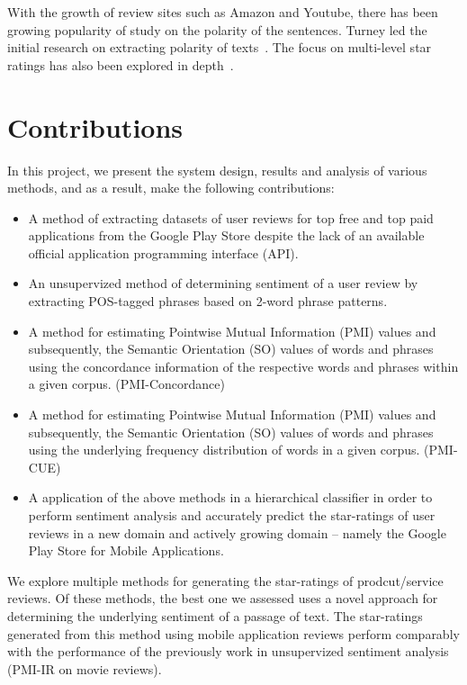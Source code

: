 \documentclass[11pt]{report} %
\begin{document}
With the growth of review sites such as Amazon and Youtube, there has been
growing popularity of study on the polarity of the sentences. Turney led the
initial research on extracting polarity of texts~\cite{Turney2001,
Pang:2002:TUS:1118693.1118704}. The focus on multi-level star ratings has also
been explored in depth~\cite{Pang+Lee:05a}.


\section{Contributions}
In this project, we present the system design, results and analysis of various methods, and as a result, make the following contributions:
\begin{itemize}
	\item A method of extracting datasets of user reviews for top free and top paid applications from the Google Play Store despite the lack of an available official application programming interface (API).
	\item An unsupervized method of determining sentiment of a user review by extracting POS-tagged phrases based on 2-word phrase patterns.
	\item A method for estimating Pointwise Mutual Information (PMI) values and subsequently, the Semantic Orientation (SO) values of words and phrases using the concordance information of the respective words and phrases within a given corpus. (PMI-Concordance)
	\item A method for estimating Pointwise Mutual Information (PMI) values and subsequently, the Semantic Orientation (SO) values of words and phrases using the underlying frequency distribution of words in a given corpus. (PMI-CUE)
	\item A application of the above methods in a  hierarchical classifier in order to perform sentiment analysis and accurately predict the star-ratings of user reviews in a new domain and actively growing domain -- namely the Google Play Store for Mobile Applications.
\end{itemize}

We explore multiple methods for generating the star-ratings of prodcut/service reviews. Of these methods, the best one we assessed uses a novel approach for determining the underlying sentiment of a passage of text. The star-ratings generated from this method using mobile application reviews perform comparably with the performance of the previously work in unsupervized sentiment analysis (PMI-IR on movie reviews).
\end{document}
